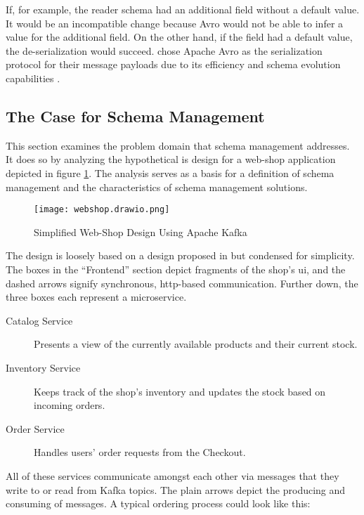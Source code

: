 If, for example, the reader schema had an additional field without a default value.
It would be an incompatible change because Avro would not be able to infer a value for the additional field.
On the other hand, if the field had a default value, the de-serialization would succeed.
\citeauthor{kreps_kafka_2011} chose Apache Avro as the serialization protocol for their message payloads due to its efficiency and schema evolution capabilities \parencite{kreps_kafka_2011}. 

\subsection{The Case for Schema Management}

This section examines the problem domain that schema management addresses.
It does so by analyzing the hypothetical \gls{is} design for a web-shop application depicted in figure \ref{fig:web-shop}.
The analysis serves as a basis for a definition of schema management and the characteristics of schema management solutions.

\begin{figure}[H]
  \centering
  \texttt{[image: webshop.drawio.png]}
  \caption{Simplified Web-Shop Design Using Apache Kafka}\label{fig:web-shop}
\end{figure}

The design is loosely based on a design proposed in \cite[p.~148]{stopford_designing_2018} but condensed for simplicity.
The boxes in the \enquote{Frontend} section depict fragments of the shop's \gls{ui}, and the dashed arrows signify synchronous, \gls{http}-based communication.
Further down, the three boxes each represent a microservice.

\begin{description}
  \item[Catalog Service] Presents a view of the currently available products and their current stock.
  \item[Inventory Service] Keeps track of the shop's inventory and updates the stock based on incoming orders.
  \item[Order Service] Handles users' order requests from the Checkout.
\end{description}

All of these services communicate amongst each other via messages that they write to or read from Kafka topics.
The plain arrows depict the producing and consuming of messages.
A typical ordering process could look like this:

